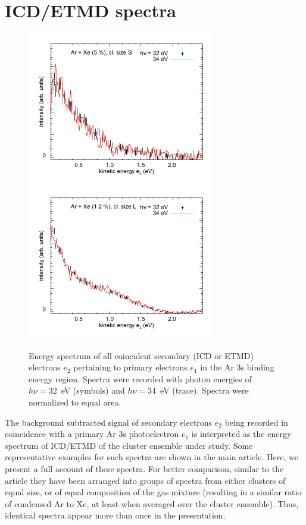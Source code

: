 \documentclass[journal=jpccck,manuscript=suppinfo]{achemso}
\begin{document}
\section{ICD/ETMD spectra}
%
\begin{figure}
 \centering
 \includegraphics[width=8.2cm]{pics/630_631_cs.pdf}
 \includegraphics[width=8.2cm]{pics/673_674_cs.pdf}
 \caption{
Energy spectrum of all coincident secondary (ICD or ETMD) electrons $e_2$ pertaining to primary electrons $e_1$ in the Ar 3s binding energy region. 
Spectra were recorded with photon energies of $h\nu = 32$~eV (symbols) and $h\nu = 34$~eV (trace). 
Spectra were normalized to equal area. 
 \label{figure:hnucomp}
 }
\end{figure}
%
The background subtracted signal of secondary electrons $e_2$ being recorded in coincidence with a primary Ar 3s photoelectron $e_1$ is interpreted as the energy spectrum of ICD/ETMD of the cluster ensemble under study.
Some representative examples for such spectra are shown in the main article.
Here, we present a full account of these spectra.
For better comparison, similar to the article they have been arranged into groups of spectra from either clusters of equal size, or of equal composition of the gas mixture (resulting in a similar ratio of condensed Ar to Xe, at least when averaged over the cluster ensemble).
Thus, identical spectra appear more than once in the presentation.
\end{document}
